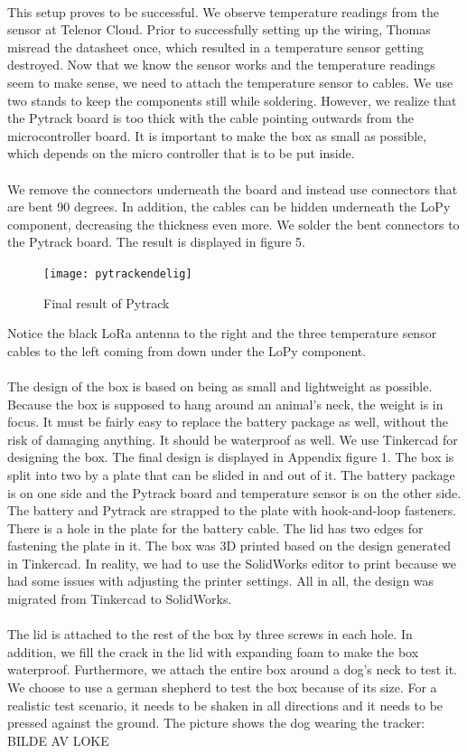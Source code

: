 		\\
		This setup proves to be successful. We observe temperature readings from the sensor at Telenor Cloud. Prior to successfully setting up the wiring, Thomas misread the datasheet once, which resulted in a temperature sensor getting destroyed. Now that we know the sensor works and the temperature readings seem to make sense, we need to attach the temperature sensor to cables. We use two stands to keep the components still while soldering. However, we realize that the Pytrack board is too thick with the cable pointing outwards from the microcontroller board. It is important to make the box as small as possible, which depends on the micro controller that is to be put inside. 
		\\\\
		We remove the connectors underneath the board and instead use connectors that are bent 90 degrees. In addition, the cables can be hidden underneath the LoPy component, decreasing the thickness even more. We solder the bent connectors to the Pytrack board. The result is displayed in figure 5. 
		\begin{figure}[h]
			\caption{Final result of Pytrack}
			\texttt{[image: pytrackendelig]}
		\end{figure}
		Notice the black LoRa antenna to the right and the three temperature sensor cables to the left coming from down under the LoPy component. 
		\\\\
		The design of the box is based on being as small and lightweight as possible. Because the box is supposed to hang around an animal’s neck, the weight is in focus. It must be fairly easy to replace the battery package as well, without the risk of damaging anything. It should be waterproof as well. We use Tinkercad for designing the box. The final design is displayed in Appendix figure 1.
		The box is split into two by a plate that can be slided in and out of it. The battery package is on one side and the Pytrack board and temperature sensor is on the other side. The battery and Pytrack are strapped to the plate with hook-and-loop fasteners. There is a hole in the plate for the battery cable. The lid has two edges for fastening the plate in it. The box was 3D printed based on the design generated in Tinkercad. In reality, we had to use the SolidWorks editor to print because we had some issues with adjusting the printer settings. All in all, the design was migrated from Tinkercad to SolidWorks.
		\\\\
		The lid is attached to the rest of the box by three screws in each hole. In addition, we 
		fill the crack in the lid with expanding foam to make the box waterproof. Furthermore, we attach the entire box around a dog’s neck to test it. We choose to use a german shepherd to test the box because of its size. For a realistic test scenario, it needs to be shaken in all directions and it needs to be pressed against the ground. The picture shows the dog wearing the tracker:
		BILDE AV LOKE
		
